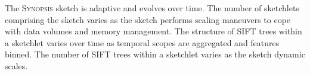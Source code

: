 The \textsc{Synopsis} sketch is adaptive and evolves over time. The number of sketchlets comprising the sketch varies as the sketch performs scaling maneuvers to cope with data volumes and memory management. 
The structure of SIFT trees within a sketchlet varies over time as temporal scopes are aggregated and features binned. The number of SIFT trees within a sketchlet varies as the sketch dynamic scales.
